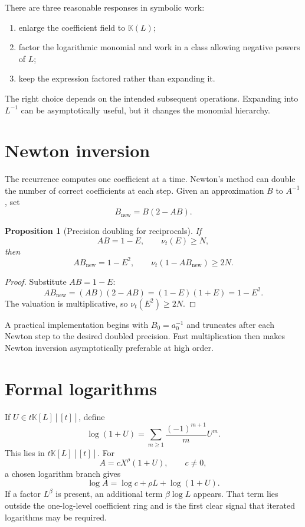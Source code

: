 \documentclass[11pt,openany]{book}
\theoremstyle{definition}
\theoremstyle{plain}
\newtheorem{proposition}{Proposition}[chapter]
\theoremstyle{remark}
\newcommand{\K}{\mathbb{K}}
\newcommand{\val}{\nu}
\begin{document}
There are three reasonable responses in symbolic work:
\begin{enumerate}
\item enlarge the coefficient field to \(\K(L)\);
\item factor the logarithmic monomial and work in a class allowing negative
powers of \(L\);
\item keep the expression factored rather than expanding it.
\end{enumerate}
The right choice depends on the intended subsequent operations.  Expanding into
\(L^{-1}\) can be asymptotically useful, but it changes the monomial hierarchy.

\section{Newton inversion}
The recurrence computes one coefficient at a time.  Newton's method can double
the number of correct coefficients at each step.  Given an approximation \(B\)
to \(A^{-1}\), set
\begin{equation}\label{eq:newton-recip}
 B_{\mathrm{new}}=B(2-AB).
\end{equation}

\begin{proposition}[Precision doubling for reciprocals]\label{prop:newton-recip}
If
\[
 AB=1-E,
 \qquad \val_t(E)\ge N,
\]
then
\[
 AB_{\mathrm{new}}=1-E^2,
 \qquad \val_t(1-AB_{\mathrm{new}})\ge2N.
\]
\end{proposition}
\begin{proof}
Substitute \(AB=1-E\):
\[
 AB_{\mathrm{new}}
 =(AB)(2-AB)=(1-E)(1+E)=1-E^2.
\]
The valuation is multiplicative, so \(\val_t(E^2)\ge2N\).
\end{proof}

A practical implementation begins with \(B_0=a_0^{-1}\) and truncates after
each Newton step to the desired doubled precision.  Fast multiplication then
makes Newton inversion asymptotically preferable at high order.

\section{Formal logarithms}
If \(U\in t\K[L][[t]]\), define
\begin{equation}\label{eq:formal-log1p}
 \log(1+U)=\sum_{m\ge1}\frac{(-1)^{m+1}}mU^m.
\end{equation}
This lies in \(t\K[L][[t]]\).  For
\[
 A=cX^\rho(1+U),
 \qquad c\ne0,
\]
a chosen logarithm branch gives
\begin{equation}\label{eq:formal-log-general}
 \log A=\log c+\rho L+\log(1+U).
\end{equation}
If a factor \(L^\beta\) is present, an additional term \(\beta\log L\) appears.
That term lies outside the one-log-level coefficient ring and is the first clear
signal that iterated logarithms may be required.
\end{document}
